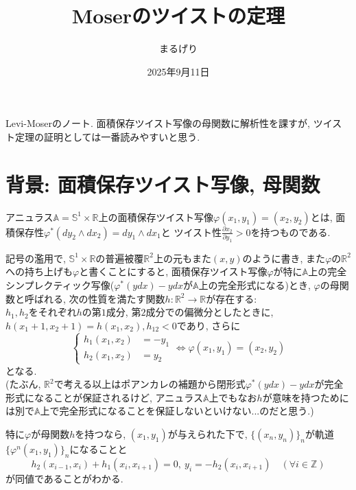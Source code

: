 \documentclass[a4paper]{ujarticle}
\title{Moserのツイストの定理}
\numberwithin{equation}{section}
\theoremstyle{definition}
\begin{document}
\date{2025年9月11日}
\author{まるげり}
\maketitle
    Levi-Moser\cite{LM01}のノート. 
    面積保存ツイスト写像の母関数に解析性を課すが, ツイスト定理の証明としては一番読みやすいと思う. 

    \section{背景: 面積保存ツイスト写像, 母関数}
        アニュラス$\mathbb{A} = \mathbb{S}^1 \times \mathbb{R}$上の面積保存ツイスト写像$\varphi(x_1, y_1) = (x_2, y_2)$とは, 
        面積保存性$\varphi^{*}(dy_2 \wedge dx_2) = d y_1 \wedge d x_1$と
        ツイスト性$\displaystyle \frac{\partial x_2}{\partial y_1} > 0$を持つものである.

        記号の濫用で, $\mathbb{S}^1 \times \mathbb{R}$の普遍被覆$\mathbb{R}^2$上の元もまた$(x, y)$のように書き, 
        また$\varphi$の$\mathbb{R}^2$への持ち上げも$\varphi$と書くことにすると, 
        面積保存ツイスト写像$\varphi$が特に$\mathbb{A}$上の完全シンプレクティック写像($\varphi^{*}(y dx) - y dx$が$\mathbb{A}$上の完全形式になる)とき, 
        $\varphi$の母関数と呼ばれる, 次の性質を満たす関数$h: \mathbb{R}^2 \rightarrow \mathbb{R}$が存在する:\\
        $h_1, h_2$をそれぞれ$h$の第$1$成分, 第$2$成分での偏微分としたときに, $h(x_1 + 1, x_2 + 1) = h(x_1, x_2), h_{12} < 0$であり, 
        さらに
        \[
            \left\{
            \begin{aligned}
                h_1(x_1, x_2) &= - y_1 \\
                h_2(x_1, x_2) &= y_2
            \end{aligned}
            \right.
            \iff \varphi(x_1, y_1) = (x_2, y_2)
        \]
        となる.\\
        (たぶん, $\mathbb{R}^2$で考える以上はポアンカレの補題から閉形式$\varphi^{*}(y dx) - y dx$が完全形式になることが保証されるけど, 
        アニュラス$\mathbb{A}$上でもなお$h$が意味を持つためには別で$\mathbb{A}$上で完全形式になることを保証しないといけない...のだと思う.)
        
        特に$\varphi$が母関数$h$を持つなら, $(x_1, y_1)$が与えられた下で, $\{(x_n, y_n)\}_{n}$が軌道$\{\varphi^{n}(x_1, y_1)\}_{n}$になることと
        \[
                h_2(x_{i-1}, x_{i}) + h_1(x_{i}, x_{i+1}) = 0, \ y_i = - h_2(x_{i}, x_{i+1}) \quad (\forall i \in \mathbb{Z})
        \]
        が同値であることがわかる.
\end{document}

